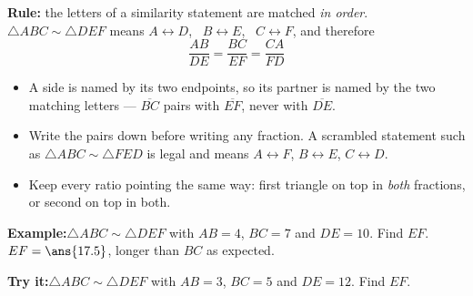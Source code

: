 \documentclass[12pt]{article}
\begin{document}


\begin{formulabox}
\textbf{Rule:} the letters of a similarity statement are matched \emph{in order}.
$\triangle ABC \sim \triangle DEF$ means
$A \leftrightarrow D$, \ $B \leftrightarrow E$, \ $C \leftrightarrow F$, and
therefore
\[ \frac{AB}{DE} = \frac{BC}{EF} = \frac{CA}{FD} \]
\begin{itemize}[leftmargin=0.8cm, itemsep=1pt, topsep=2pt]
  \item A side is named by its two endpoints, so its partner is named by the two
        matching letters --- $\overline{BC}$ pairs with $\overline{EF}$, never with
        $\overline{DE}$.
  \item Write the pairs down before writing any fraction. A scrambled statement
        such as $\triangle ABC \sim \triangle FED$ is legal and means
        $A \leftrightarrow F$, $B \leftrightarrow E$, $C \leftrightarrow D$.
  \item Keep every ratio pointing the same way: first triangle on top in
        \emph{both} fractions, or second on top in both.
\end{itemize}
\end{formulabox}

\begin{examplebox}
\textbf{Example:}\quad $\triangle ABC \sim \triangle DEF$ with $AB = 4$, $BC = 7$
and $DE = 10$. Find $EF$.
$EF = \ans{17.5}$, longer than $BC$ as expected.
\end{examplebox}

\begin{tryitbox}
\textbf{Try it:}\quad $\triangle ABC \sim \triangle DEF$ with $AB = 3$, $BC = 5$
and $DE = 12$. Find $EF$.\\[2pt]
\end{tryitbox}

\end{document}
